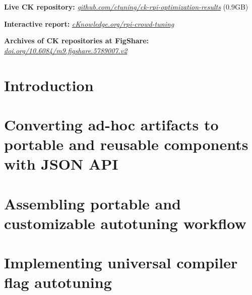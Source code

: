 \documentclass[10pt,letterpaper,twocolumn]{article}
\begin{document}
{\bf Live CK repository:} \newline
\textit{\href{https://github.com/ctuning/ck-rpi-optimization-results}{github.com/ctuning/ck-rpi-optimization-results}} (0.9GB)

{\bf Interactive report:} \newline
\textit{\href{http://cKnowledge.org/rpi-crowd-tuning}{cKnowledge.org/rpi-crowd-tuning}}

{\bf Archives of CK repositories at FigShare:} \newline
\textit{\href{https://doi.org/10.6084/m9.figshare.5789007.v2}{doi.org/10.6084/m9.figshare.5789007.v2}}



\section{Introduction} %
\label{introduction} %


\section{Converting ad-hoc artifacts to portable and reusable components with JSON API}
\label{sec:converting}


\section{Assembling portable and customizable autotuning workflow}
\label{sec:autotuning}


\section{Implementing universal compiler flag autotuning}
\label{sec:flag_autotuning}

\end{document}
